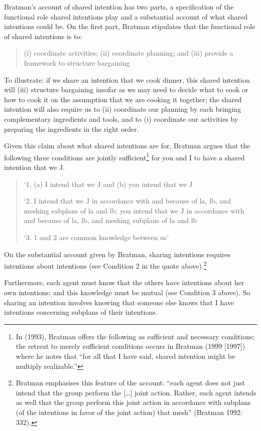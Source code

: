 \documentclass[12pt,a4paper]{extarticle}
\begin{document}
Bratman's account of shared intention has two parts, 
a specification of the functional role shared intentions play 
and a substantial account of what shared intentions could be.  
On the first part, Bratman stipulates that the functional role of shared intentions is to: 
%
\begin{quote}
(i) coordinate activities; (ii) coordinate planning; and (iii) provide a framework to structure bargaining \citep[p.\ 99]{Bratman:1993je}
\end{quote}
%
To illustrate: if we share an intention that we cook dinner, this shared intention will 
(iii) structure bargaining insofar as we may need to decide what to cook or how to cook it on the assumption that we are cooking it together; the shared intention will also require us to 
(ii) coordinate our planning by each bringing complementary ingredients and tools, and to 
(i) coordinate our activities by preparing the ingredients in the right order.

Given this claim about what shared intentions are for, Bratman argues that the following three conditions are jointly sufficient\footnote{
In (1993), Bratman offers the following as sufficient and necessary conditions; the retreat to merely sufficient conditions occurs in Bratman (1999 [1997]) where he notes that “for all that I have said, shared intention might be multiply realizable.”
}  
for you and I to have a shared intention that we J. 
%
\begin{quote}
`1. (a) I intend that we J and (b) you intend that we J

`2. I intend that we J in accordance with and because of la, lb, and meshing subplans of la and lb; you intend that we J in accordance with and because of la, lb, and meshing subplans of la and lb

`3. 1 and 2 are common knowledge between us' \citep[View 4]{Bratman:1993je}
\end{quote}
%
On the substantial account given by Bratman, sharing intentions requires intentions about intentions (see Condition 2 in the quote above).\footnote{
Bratman emphasises this feature of the account: “each agent does not just intend that the group perform the […] joint action. Rather, each agent intends as well that the group perform this joint action in accordance with subplans (of the intentions in favor of the joint action) that mesh” (Bratman 1992: 332).
}

Furthermore, each agent must know that the others have intentions about her own intentions; and this knowledge must be mutual (see Condition 3 above).  So sharing an intention involves knowing that someone else knows that I have intentions concerning subplans of their intentions.  
\end{document}
